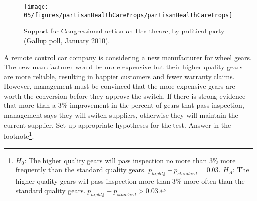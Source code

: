 \begin{figure}
\centering
\texttt{[image: 05/figures/partisanHealthCareProps/partisanHealthCareProps]}
\caption{Support for Congressional action on Healthcare, by political party (Gallup poll, January 2010).}
\label{partisanHealthCareProps}
\end{figure}

\pagebreak

\begin{exercise}\label{carWheelGearManufacturer}
A remote control car company is considering a new manufacturer for wheel gears. The new manufacturer would be more expensive but their higher quality gears are more reliable, resulting in happier customers and fewer warranty claims. However, management must be convinced that the more expensive gears are worth the conversion before they approve the switch. If there is strong evidence that more than a 3\% improvement in the percent of gears that pass inspection, management says they will switch suppliers, otherwise they will maintain the current supplier. Set up appropriate hypotheses for the test. Answer in the footnote\footnote{$H_0$: The higher quality gears will pass inspection no more than 3\% more frequently than the standard quality gears. $p_{highQ} - p_{standard} = 0.03$. $H_A$: The higher quality gears will pass inspection more than 3\% more often than the standard quality gears. $p_{highQ} - p_{standard} > 0.03$.}.
\end{exercise}

